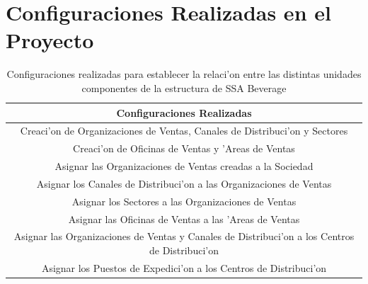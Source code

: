 \chapter{Configuraciones Realizadas en el Proyecto}
\begin{table}[htb]
\footnotesize
\begin{tabular}{|c|}
\hline
\textbf{Configuraciones Realizadas}\\
\hline
Creaci'on de Organizaciones de Ventas, Canales de Distribuci'on y Sectores\\
\hline
Creaci'on de Oficinas de Ventas y 'Areas de Ventas\\
\hline
 Asignar las Organizaciones de Ventas creadas a la Sociedad\\
\hline
Asignar los Canales de Distribuci'on a las Organizaciones de Ventas\\
\hline
Asignar los Sectores a las Organizaciones de Ventas \\
\hline
Asignar las Oficinas de Ventas a las 'Areas de Ventas\\
\hline
Asignar las Organizaciones de Ventas y Canales de Distribuci'on a los Centros de Distribuci'on\\
\hline
Asignar los Puestos de Expedici'on a los Centros de Distribuci'on\\
\hline
\end{tabular}
\caption{Configuraciones realizadas para establecer la relaci'on entre las distintas unidades componentes de la estructura de SSA Beverage}
\label{tb:asignaciones}
\end{table}
